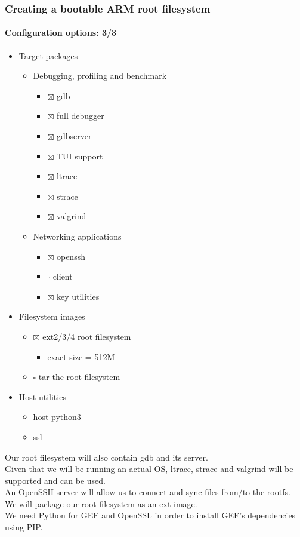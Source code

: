 \begin{frame}
  \frametitle{Creating a bootable ARM root filesystem}
  \framesubtitle{Configuration options: 3/3}
  \begin{itemize}
    \item Target packages
    \begin{itemize}
      \item Debugging, profiling and benchmark
      \begin{itemize}
        \item $\boxtimes$ gdb
        \item $\boxtimes$ full debugger
        \item $\boxtimes$ gdbserver
        \item $\boxtimes$ TUI support
        \item $\boxtimes$ ltrace
        \item $\boxtimes$ strace
        \item $\boxtimes$ valgrind
      \end{itemize}
      \item Networking applications
      \begin{itemize}
        \item $\boxtimes$ openssh
        \item $\square$ client
        \item $\boxtimes$ key utilities
      \end{itemize}
    \end{itemize}
    \item Filesystem images
    \begin{itemize}
      \item $\boxtimes$ ext2/3/4 root filesystem
      \begin{itemize}
        \item exact size = 512M
      \end{itemize}
      \item $\square$ tar the root filesystem
    \end{itemize}
    \item Host utilities
    \begin{itemize}
      \item host python3
      \item ssl
    \end{itemize}
  \end{itemize}
\end{frame}
 {
  Our root filesystem will also contain gdb and its server. \\
  Given that we will be running an actual OS, ltrace, strace and valgrind will be supported and can be used. \\
  An OpenSSH server will allow us to connect and sync files from/to the rootfs. \\
  We will package our root filesystem as an ext image. \\
  We need Python for GEF and OpenSSL in order to install GEF's dependencies using PIP.
}

